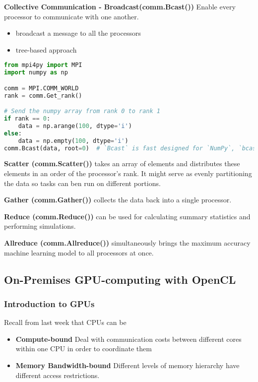 \documentclass{article}
\begin{document}
\textbf{Collective Communication - Broadcast(comm.Bcast())}
Enable every processor to communicate with one another.
\begin{itemize}
    \item broadcast a message to all the processors
    \item tree-based approach
\end{itemize}

\begin{lstlisting}[language=Python]
from mpi4py import MPI
import numpy as np

comm = MPI.COMM_WORLD
rank = comm.Get_rank()

# Send the numpy array from rank 0 to rank 1
if rank == 0:
    data = np.arange(100, dtype='i')
else:
    data = np.empty(100, dtype='i')
comm.Bcast(data, root=0)  # `Bcast` is fast designed for `NumPy`, `bcast` is slow designed for all obj.
\end{lstlisting}

\textbf{Scatter (comm.Scatter())} takes an array of elements and distributes these elements in an order of the processor's rank. It might serve as evenly partitioning the data so tasks can ben run on different portions.

\textbf{Gather (comm.Gather())} collects the data back into a single processor.

\textbf{Reduce (comm.Reduce())} can be used for calculating summary statistics and performing simulations.

\textbf{Allreduce (comm.Allreduce())} simultaneously brings the maximum accuracy machine learning model to all processors at once.

\subsection{On-Premises GPU-computing with OpenCL}

\subsubsection{Introduction to GPUs}

Recall from last week that CPUs can be

\begin{itemize}
    \item \textbf{Compute-bound} Deal with communication costs between different cores within one CPU in order to coordinate them
    \item \textbf{Memory Bandwidth-bound} Different levels of memory hierarchy have different access restrictions.
\end{itemize}
\end{document}
